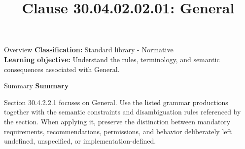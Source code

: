 \documentclass[10pt,letterpaper]{article}
\title{Clause 30.04.02.02.01: General}
\author{}
\date{}
\begin{document}
\maketitle
\begin{CornellOverviewBox}{Overview}
\textbf{Classification:} Standard library - Normative\\[2pt]
\textbf{Learning objective:} Understand the rules, terminology, and semantic consequences associated with General.
\end{CornellOverviewBox}\begin{CornellSummaryBox}{Summary}
{\sffamily\bfseries\color{Accent} Summary}\par\vspace{3pt}Section 30.4.2.2.1 focuses on General. Use the listed grammar productions together with the semantic constraints and disambiguation rules referenced by the section. When applying it, preserve the distinction between mandatory requirements, recommendations, permissions, and behavior deliberately left undefined, unspecified, or implementation-defined.
\end{CornellSummaryBox}
\end{document}
